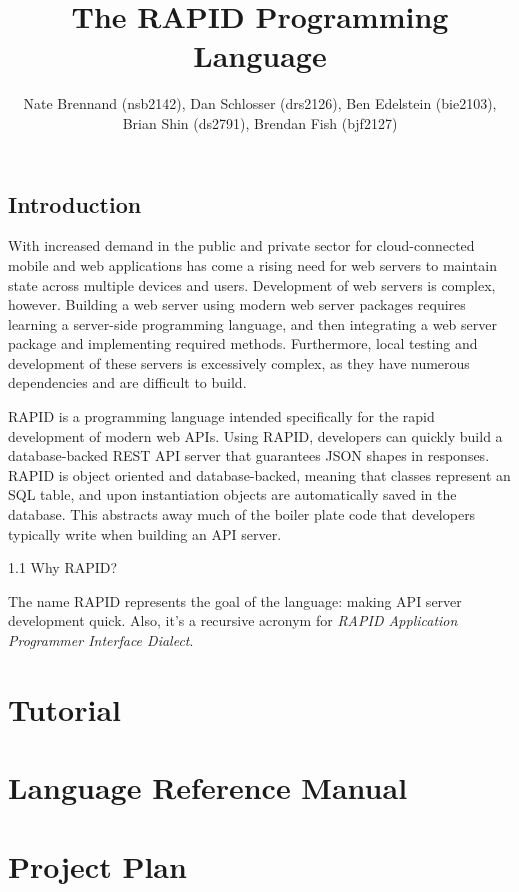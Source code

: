 \documentclass[11pt]{article}
\author{
  Nate Brennand (nsb2142),
  Dan Schlosser (drs2126),
  Ben Edelstein (bie2103),
  Brian Shin (ds2791),
  Brendan Fish (bjf2127)
}
\title{The RAPID Programming Language}
\begin{document}
\setlength{\parskip}{.1 in}

\maketitle
\newpage

\subsection*{Introduction}

With increased demand in the public and private sector for cloud-connected mobile and web applications has come a rising need for web servers to maintain state across multiple devices and users.
Development of web servers is complex, however. Building a web server using modern web server packages requires learning a server-side programming language, and then integrating a web server package and implementing required methods.
Furthermore, local testing and development of these servers is excessively complex, as they have numerous dependencies and are difficult to build.

RAPID is a programming language intended specifically for the rapid development of modern web APIs.
Using RAPID, developers can quickly build a database-backed REST API server that guarantees JSON shapes in responses.
RAPID is object oriented and database-backed, meaning that classes represent an SQL table, and upon instantiation objects are automatically saved in the database.
This abstracts away much of the boiler plate code that developers typically write when building an API server.


1.1 Why RAPID?

The name RAPID represents the goal of the language: making API server development quick.
Also, it's a recursive acronym for \textit{RAPID Application Programmer Interface Dialect}.



\section*{Tutorial}

\newpage

\section*{Language Reference Manual}

\newpage

\section*{Project Plan}

\newpage
\end{document}
